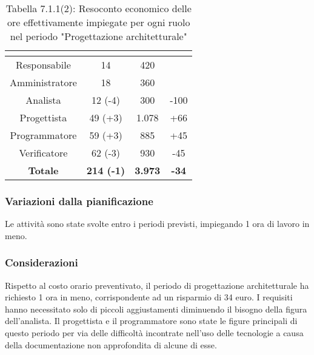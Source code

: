 \renewcommand{\arraystretch}{1.4}
\begin{table}[H]
\begin{center}
\begin{tabular}{|c|c|c|c|}
\hline
\rowcolor{title_row}
\textbf{\color{title_text}{Ruolo}}  & \textbf{\color{title_text}{Ore}} & \textbf{\color{title_text}{Costo in \euro}} & \textbf{\color{title_text}{Differenza al preventivo in \euro}} \\ \hline
Responsabile    & 14 & 420 &  \\ \hline
Amministratore  & 18 & 360 &  \\ \hline
Analista        & 12 (-4) & 300 & -100 \\ \hline
Progettista     & 49 (+3) & 1.078 & +66 \\ \hline
Programmatore   & 59 (+3) & 885 & +45  \\ \hline
Verificatore    & 62 (-3) & 930 & -45  \\ \hline
\textbf{Totale} & \textbf{214 (-1)}    & \textbf{3.973} & \textbf{-34} \\ \hline
\end{tabular}
\caption{Tabella 7.1.1(2): Resoconto economico delle ore effettivamente impiegate per ogni ruolo nel periodo "Progettazione architetturale"\label{}}
\end{center}
\end{table}
\renewcommand{\arraystretch}{1}


\subsubsection{Variazioni dalla pianificazione}
Le attività sono state svolte entro i periodi previsti, impiegando 1 ora di lavoro in meno.

\subsubsection{Considerazioni}
Rispetto al costo orario preventivato, il periodo di progettazione architetturale ha richiesto 1 ora in meno, corrispondente ad un risparmio di 34 euro.
I requisiti hanno necessitato solo di piccoli aggiustamenti diminuendo il bisogno della figura dell'analista. Il progettista e il programmatore sono state
le figure principali di questo periodo per via delle difficoltà incontrate nell'uso delle tecnologie a causa della documentazione non approfondita di alcune di esse.
\pagebreak
